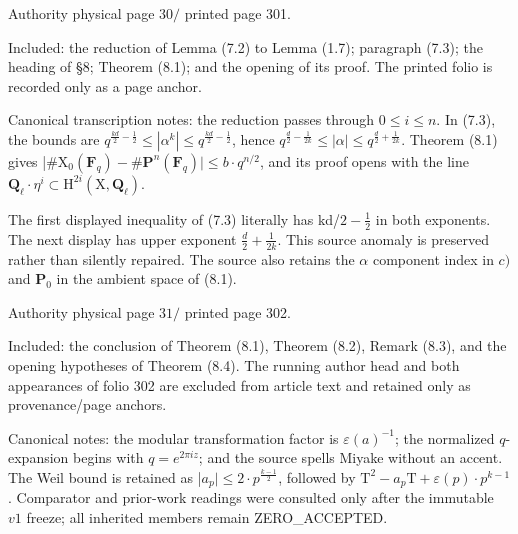 \documentclass[10pt,leqno]{article}
\begin{document}
\noindent Authority physical page \(30 /\) printed page 301.\par

\noindent Included: the reduction of Lemma (7.2) to Lemma (1.7); paragraph (7.3); the heading of §8; Theorem (8.1); and the opening of its proof. The printed folio is recorded only as a page anchor.\par

\noindent Canonical transcription notes: the reduction passes through \(0\leq i\leq n\). In (7.3), the bounds are \(q^{\frac{kd}{2}- \frac{1}{2}}\leq |\alpha ^{k}|\leq q^{\frac{kd}{2}- \frac{1}{2}}\), hence \(q^{\frac{d}{2}- \frac{1}{2k}}\leq |\alpha |\leq q^{\frac{d}{2}+\frac{1}{2k}}\). Theorem (8.1) gives |\(\# \mathrm{X}_{0}(\mathbf{F}_{q})- \# \mathbf{P}^{n}(\mathbf{F}_{q})|\leq b\cdot q^{n/2}\), and its proof opens with the line \(\mathbf{Q}_{\ell }\cdot \eta ^{i}\subset \mathrm{H}^{2i}(\mathrm{X},\mathbf{Q}_{\ell })\).\par

\noindent The first displayed inequality of (7.3) literally has kd/\(2- \frac{1}{2}\) in both exponents. The next display has upper exponent \(\frac{d}{2}+\frac{1}{2k}\). This source anomaly is preserved rather than silently repaired. The source also retains the \(\alpha \) component index in \(c)\) and \(\mathbf{P}_{0}\) in the ambient space of (8.1).\par

\clearpage

\label{physical-31}\par\smallskip

\noindent Authority physical page \(31 /\) printed page 302.\par

\noindent Included: the conclusion of Theorem (8.1), Theorem (8.2), Remark (8.3), and the opening hypotheses of Theorem (8.4). The running author head and both appearances of folio 302 are excluded from article text and retained only as provenance/page anchors.\par

\noindent Canonical notes: the modular transformation factor is \(\varepsilon (a)^{-1}\); the normalized \(q\)-expansion begins with \(q=e^{2\pi iz}\); and the source spells Miyake without an accent. The Weil bound is retained as |\(a_{p}|\leq 2\cdot p^{\frac{k-1}{2}}\), followed by \(\mathrm{T}^{2}-a_{p}\mathrm{T}+\varepsilon (p)\cdot p^{k-1}\). Comparator and prior-work readings were consulted only after the immutable \(v1\) freeze; all inherited members remain ZERO\_ACCEPTED.\par
\end{document}
